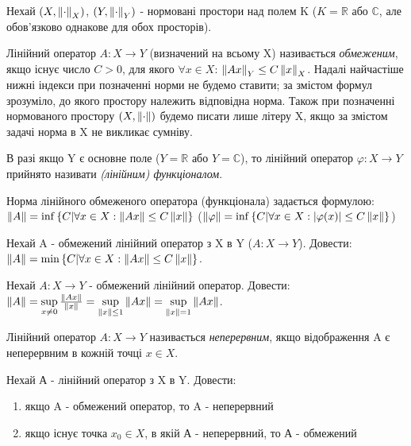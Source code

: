 
\begin{theory}
    Нехай $(X, \left\lVert\cdot\right\rVert_X)$, $(Y, \left\lVert\cdot\right\rVert_Y)$ - нормовані простори над полем K ($K = 
    \mathbb{R}$ або $\mathbb{C}$, 
    але обов'язково однакове для обох просторів). 

    Лінійний оператор $A: X \rightarrow Y$ (визначений на всьому X) називається 
    \emph{обмеженим}, якщо існує число $C > 0$, для якого $\forall x \in X$: 
    $\left\lVert Ax\right\rVert_Y \leq C \left\lVert x\right\rVert_X$. Надалі найчастіше нижні індекси при позначенні норми 
    не будемо ставити; за змістом формул зрозуміло, до якого простору належить відповідна 
    норма. Також при позначенні нормованого простору $(X, \left\lVert\cdot\right\rVert)$ будемо писати лише 
    літеру X, якщо за змістом задачі норма в X не викликає сумніву. 

    В разі якщо Y є основне поле ($Y=\mathbb{R}$ або $Y = \mathbb{C}$), то лінійний оператор 
    $\varphi: X \rightarrow Y$ прийнято називати \emph{(лінійним) функціоналом}.

    Норма лінійного обмеженого оператора (функціонала) задається формулою: 
    $\left\lVert A\right\rVert = \inf\left\{C | \forall x \in X : \left\lVert Ax\right\rVert\leq C\left\lVert x\right\rVert \right\}$
    ($\left\lVert\varphi\right\rVert = \inf\left\{C | \forall x \in X : |\varphi(x)|\leq C\left\lVert x\right\rVert \right\}$)
\end{theory}

\begin{exercise}
    Нехай A - обмежений лінійний оператор з X в Y ($A: X \rightarrow Y$).
    Довести: $\left\lVert A\right\rVert = \min\left\{C|\forall x \in X : \left\lVert Ax\right\rVert \leq C\left\lVert x\right\rVert\right\}$.
\end{exercise}

\begin{exercise}
    Нехай $A: X \rightarrow Y$ - обмежений лінійний оператор.
    Довести: $\left\lVert A\right\rVert = \sup\limits_{x \neq 0}\frac{\left\lVert Ax\right\rVert}{\left\lVert x\right\rVert} = 
    \sup\limits_{\left\lVert x\right\rVert \leq 1}\left\lVert Ax\right\rVert = \sup\limits_{\left\lVert x\right\rVert = 1}\left\lVert Ax\right\rVert$.
\end{exercise}

\begin{theory}
    Лінійний оператор $A: X \rightarrow Y$ називається \emph{неперервним}, якщо відображення 
    A є неперервним в кожній точці $x \in X$.
\end{theory}

\begin{exercise}
    Нехай А - лінійний оператор з X в Y. Довести: 
    \begin{enumerate}[label=\alph*)]
        \item якщо A - обмежений оператор, то A - неперервний
        \item якщо існує точка $x_0 \in X$, в якій А - неперервний, то А - обмежений
    \end{enumerate}
\end{exercise}

